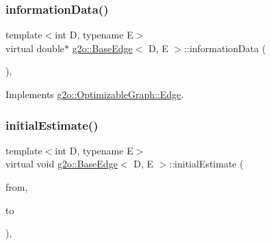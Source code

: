 \mbox{\label{classg2o_1_1_base_edge_a72ae9d215d6abc892f735e3d3ab81a88}} 
\subsubsection{\texorpdfstring{information\+Data()}{informationData()}\hspace{0.1cm}{\footnotesize\ttfamily [2/2]}}
{\footnotesize\ttfamily template$<$int D, typename E$>$ \\
virtual double$\ast$ \mbox{\hyperlink{classg2o_1_1_base_edge}{g2o\+::\+Base\+Edge}}$<$ D, E $>$\+::information\+Data (\begin{DoxyParamCaption}{ }\end{DoxyParamCaption})\hspace{0.3cm}{\ttfamily [inline]}, {\ttfamily [virtual]}}



Implements \mbox{\hyperlink{classg2o_1_1_optimizable_graph_1_1_edge_a99de4bbb57e3c5e7321f150a45d1cb12}{g2o\+::\+Optimizable\+Graph\+::\+Edge}}.

\mbox{\label{classg2o_1_1_base_edge_a0c3d9763f1dc504627df75e0f381ca70}} 
\subsubsection{\texorpdfstring{initial\+Estimate()}{initialEstimate()}}
{\footnotesize\ttfamily template$<$int D, typename E$>$ \\
virtual void \mbox{\hyperlink{classg2o_1_1_base_edge}{g2o\+::\+Base\+Edge}}$<$ D, E $>$\+::initial\+Estimate (\begin{DoxyParamCaption}\item[{const \mbox{\hyperlink{classg2o_1_1_hyper_graph_a703938cdb4bb636860eed55a2489d70c}{Optimizable\+Graph\+::\+Vertex\+Set}} \&}]{from,  }\item[{\mbox{\hyperlink{classg2o_1_1_optimizable_graph_1_1_vertex}{Optimizable\+Graph\+::\+Vertex}} $\ast$}]{to }\end{DoxyParamCaption})\hspace{0.3cm}{\ttfamily [inline]}, {\ttfamily [virtual]}}

